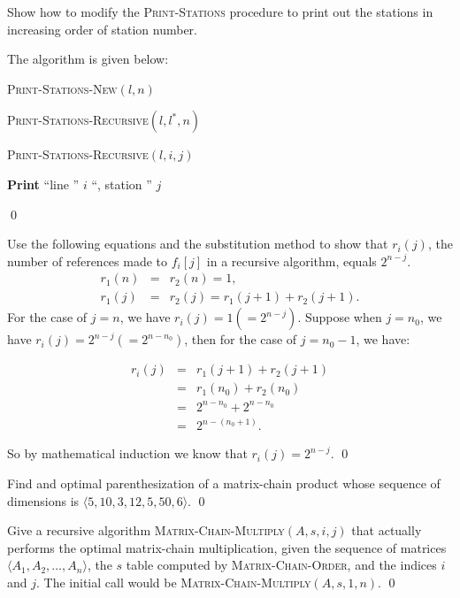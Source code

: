 Show how to modify the \textsc{Print-Stations} procedure to print out the stations in increasing order of station number.
\answer

The algorithm is given below:

\begin{algorithm}[H]
\caption{\textsc{Print-Stations-New}$(l, n)$}
\textsc{Print-Stations-Recursive}$(l, l^*, n)$
\end{algorithm}

\begin{algorithm}[H]
\caption{\textsc{Print-Stations-Recursive}$(l, i, j)$}
\textbf{Print} ``line '' $i$ ``, station '' $j$
\end{algorithm}
\qed

Use the following equations and the substitution method to show that $r_i(j)$, the number of references made to $f_i[j]$ in a recursive algorithm, equals $2^{n-j}$.
\begin{eqnarray*}
r_1(n)&=& r_2(n) = 1,\\
r_1(j) &=& r_2(j) = r_1(j + 1) + r_2(j + 1).
\end{eqnarray*}
\answer
For the case of $j = n$, we have $r_i(j) = 1 (= 2^{n - j})$. Suppose when $j = n_0$, we have $r_i(j) = 2^{n - j}(=2^{n-n_0})$, then for the case of $j = n_0 - 1$, we have:

\begin{eqnarray*}
r_i(j) &=& r_1(j + 1) + r_2(j + 1)\\
&=& r_1(n_0) + r_2(n_0)\\
&=& 2^{n - n_0} + 2^{n - n_0}\\
&=& 2^{n - (n_0 + 1)}.
\end{eqnarray*}

So by mathematical induction we know that $r_i(j) = 2^{n - j}$.
\qed

Find and optimal parenthesization of a matrix-chain product whose sequence of dimensions is $\langle5, 10, 3, 12, 5, 50, 6\rangle$.
\answer
\todo
\qed


Give a recursive algorithm \textsc{Matrix-Chain-Multiply}$(A, s, i, j)$ that actually performs the optimal matrix-chain multiplication, given the sequence of matrices 
$\langle A_1, A_2, \ldots, A_n\rangle$, the $s$ table computed by \textsc{Matrix-Chain-Order}, and the indices $i$ and $j$. The initial call would be \textsc{Matrix-Chain-Multiply}$(A, s, 1, n)$.
\answer
\todo
\qed


